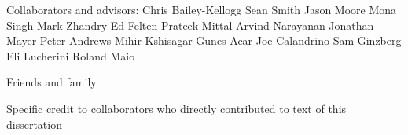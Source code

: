 Collaborators and advisors:
Chris Bailey-Kellogg
Sean Smith
Jason Moore
Mona Singh
Mark Zhandry
Ed Felten
Prateek Mittal
Arvind Narayanan
Jonathan Mayer
Peter Andrews
Mihir Kshisagar
Gunes Acar
Joe Calandrino
Sam Ginzberg
Eli Lucherini
Roland Maio

Friends and family


Specific credit to collaborators who directly contributed to text of this dissertation